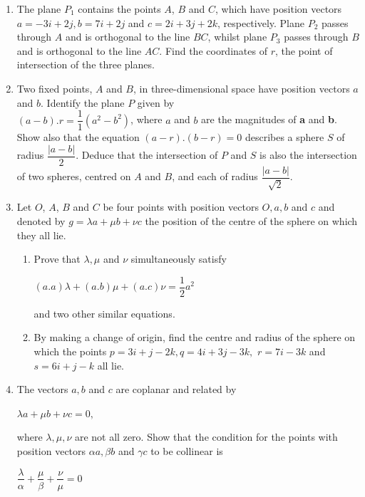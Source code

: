 \documentclass[fleqn]{article}
\begin{document}
\begin{enumerate}

  \item  The plane $P_1$ contains the points $A$, $B$ and $C$, which have position vectors $a = −3i + 2j, b = 7i + 2j$ and $c = 2i + 3j + 2k$, respectively. Plane $P_2$ passes through $A$ and is orthogonal to the line $BC$, whilst plane $P_3$ passes through $B$ and is orthogonal to the line $AC$. Find the coordinates of $r$, the point of intersection of the three planes.
  
  \item  Two fixed points, $A$ and $B$, in three-dimensional space have position vectors $a$ and $b$. Identify the plane $P$ given by \\
  $(a-b).r=\dfrac{1}{1}(a^2-b^2)$, where $a$ and $b$ are the magnitudes of \textbf{a} and \textbf{b}. Show also that the equation $(a-r).(b-r)=0$ describes a sphere $S$ of radius $\dfrac{|a − b|}{2}$. Deduce that the intersection of $P$ and $S$ is also the intersection of two spheres, centred on $A$ and $B$, and each of radius $\dfrac{|a − b|}{\sqrt{2}}$.
  
  \item  Let $O$, $A$, $B$ and $C$ be four points with position vectors $O, a, b$ and $c$ and denoted by $g=\lambda a+ \mu b+\nu c$ the position of the centre of the sphere on which they all lie.
  
  
    \begin{enumerate}
      \item Prove that $\lambda, \mu$ and $\nu$ simultaneously satisfy

      $(a.a)\lambda + (a.b) \mu+ (a.c)\nu = \dfrac{1}{2} a^2$

      and two other similar equations. 
      
      \item By making a change of origin, find the centre and radius of the sphere on which the points $p=3i+j−2k, q=4i+3j−3k,$ $r=7i−3k$ and $s=6i+j−k$ all lie.
    \end{enumerate}  
  
  \item  The vectors $a, b$ and $c$ are coplanar and related by

  $\lambda a+\mu b+\nu c=0,$
  
  where $\lambda, \mu, \nu$ are not all zero. Show that the condition for the points with position vectors $\alpha a, \beta b$ and $\gamma c$ to be collinear is 

  $\dfrac{\lambda}{\alpha}+\dfrac{\mu}{\beta}+\dfrac{\nu}{\mu}=0$


\end{enumerate}
\end{document}
